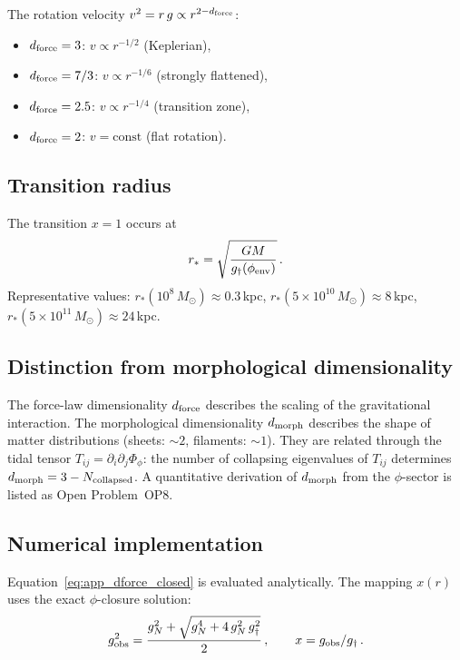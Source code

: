 \documentclass[11pt,a4paper]{article}
\numberwithin{equation}{section}
\begin{document}
\medskip
The rotation velocity $v^2 = r\,g \propto r^{2-d_{\rm force}}$:
\begin{itemize}
\item $d_{\rm force} = 3$: $v \propto r^{-1/2}$ (Keplerian),
\item $d_{\rm force} = 7/3$: $v \propto r^{-1/6}$
  (strongly flattened),
\item $d_{\rm force} = 2.5$: $v \propto r^{-1/4}$
  (transition zone),
\item $d_{\rm force} = 2$: $v = \mathrm{const}$
  (flat rotation).
\end{itemize}

\subsection{Transition radius}

The transition $x = 1$ occurs at
\begin{equation}
r_* = \sqrt{\frac{GM}{g_\dagger(\phi_{\rm env})}}\,.
\end{equation}
Representative values:
$r_*(10^8\,M_\odot) \approx 0.3\,$kpc,
$r_*(5\times10^{10}\,M_\odot) \approx 8\,$kpc,
$r_*(5\times10^{11}\,M_\odot) \approx 24\,$kpc.

\subsection{Distinction from morphological dimensionality}

The force-law dimensionality $d_{\rm force}$ describes
the scaling of the gravitational interaction.
The morphological dimensionality $d_{\rm morph}$
describes the shape of matter distributions
(sheets: $\sim 2$, filaments: $\sim 1$).
They are related through the tidal tensor
$T_{ij} = \partial_i\partial_j\Phi_\phi$:
the number of collapsing eigenvalues of $T_{ij}$
determines $d_{\rm morph} = 3 - N_{\rm collapsed}$.
A quantitative derivation of $d_{\rm morph}$ from
the $\phi$-sector is listed as Open Problem~OP8.

\subsection{Numerical implementation}

Equation~\eqref{eq:app_dforce_closed} is evaluated
analytically.  The mapping $x(r)$ uses the exact
$\phi$-closure solution:
\begin{equation}
g_{\rm obs}^2 =
\frac{g_N^2 + \sqrt{g_N^4 + 4\,g_N^2\,g_\dagger^2}}{2}\,,
\qquad x = g_{\rm obs}/g_\dagger\,.
\end{equation}
\end{document}
